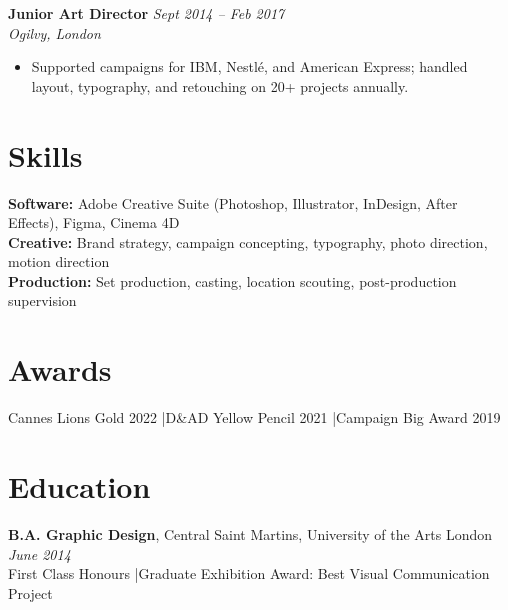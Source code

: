 \documentclass[11pt,a4paper]{article}
\begin{document}
\vspace{4pt}
\noindent\textbf{Junior Art Director} \hfill \textit{Sept 2014 -- Feb 2017}\\
\textit{Ogilvy, London}
\begin{itemize}
  \item Supported campaigns for IBM, Nestl\'e, and American Express; handled layout, typography, and retouching on 20+ projects annually.
\end{itemize}

\section{Skills}
\textbf{Software:} Adobe Creative Suite (Photoshop, Illustrator, InDesign, After Effects), Figma, Cinema 4D\\
\textbf{Creative:} Brand strategy, campaign concepting, typography, photo direction, motion direction\\
\textbf{Production:} Set production, casting, location scouting, post-production supervision

\section{Awards}
Cannes Lions Gold 2022 \quad|\quad D\&AD Yellow Pencil 2021 \quad|\quad Campaign Big Award 2019

\section{Education}
\textbf{B.A. Graphic Design}, Central Saint Martins, University of the Arts London \hfill \textit{June 2014}\\
First Class Honours \quad|\quad Graduate Exhibition Award: Best Visual Communication Project
\end{document}
